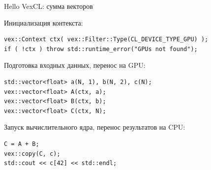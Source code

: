 \documentclass[@BEAMER_OPTIONS@]{beamer}
\begin{document}
\begin{frame}[fragile]{Hello VexCL: сумма векторов}
    \begin{exampleblock}{Инициализация контекста:}
        \begin{lstlisting}
vex::Context ctx( vex::Filter::Type(CL_DEVICE_TYPE_GPU) );
if ( !ctx ) throw std::runtime_error("GPUs not found");
        \end{lstlisting}
    \end{exampleblock}
    \pause
    \begin{exampleblock}{Подготовка входных данных, перенос на GPU:}
        \begin{lstlisting}[firstnumber=last]
std::vector<float> a(N, 1), b(N, 2), c(N);
vex::vector<float> A(ctx, a);
vex::vector<float> B(ctx, b);
vex::vector<float> C(ctx, N);
        \end{lstlisting}
    \end{exampleblock}
    \pause
    \begin{exampleblock}{Запуск вычислительного ядра, перенос результатов на
        CPU:}
        \begin{lstlisting}[firstnumber=last]
C = A + B;
vex::copy(C, c);
std::cout << c[42] << std::endl;
        \end{lstlisting}
    \end{exampleblock}
\end{frame}

\end{document}

